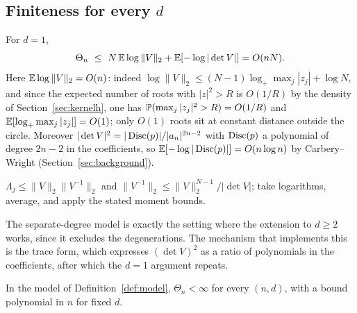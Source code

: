 \subsection{Finiteness for every $d$}

\begin{proposition}\label{prop:d1finiteness}
  For $d=1$,
  \[
    \Theta_n \ \le\ N\,\E\log\|V\|_2 + \E[-\log|\det V|] = O(nN).
  \]
  Here $\E\log\|V\|_2 = O(n)$: indeed
  $\log\|V\|_2\le(N-1)\log_+\max_j|z_j| + \log N$, and since the expected number of roots
  with $|z|^2>R$ is $O(1/R)$ by the density of Section~\ref{sec:kernelh}, one has
  $\P(\max_j|z_j|^2>R) = O(1/R)$ and $\E[\log_+\max_j|z_j|] = O(1)$; only $O(1)$ roots sit
  at constant distance outside the circle. Moreover
  $|\det V|^2 = |\Disc(p)|/|a_n|^{2n-2}$ with $\Disc(p)$ a polynomial of degree $2n-2$ in
  the coefficients, so $\E[-\log|\Disc(p)|] = O(n\log n)$ by Carbery--Wright
  (Section~\ref{sec:background}).
\end{proposition}

\proof
$\Lambda_j\le\|V\|_2\|V^{-1}\|_2$ and $\|V^{-1}\|_2\le\|V\|_2^{N-1}/|\det V|$; take
logarithms, average, and apply the stated moment bounds.
\endproof

The separate-degree model is exactly the setting where the extension to $d\ge2$ works, since
it excludes the degenerations. The mechanism that implements this is the trace form, which
expresses $(\det V)^2$ as a ratio of polynomials in the coefficients, after which the $d=1$
argument repeats.

\begin{proposition}\label{prop:finiteness}
  In the model of Definition~\ref{def:model}, $\Theta_n<\infty$ for every $(n,d)$, with a
  bound polynomial in $n$ for fixed $d$.
\end{proposition}

